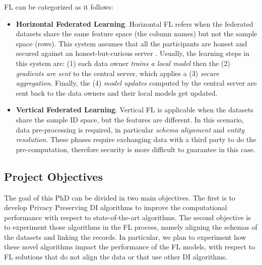 \documentclass[12pt]{article}
\begin{document}
FL can be categorized as it follows: 
\begin{itemize}
   \item \textbf{Horizontal Federated Learning}. Horizontal FL refers when the federated datasets share the same feature space (the column names) but not the sample space (rows). This system
   assumes that all the participants are honest and secured against an honest-but-curious server \cite*{Yang2019}. Usually, the learning steps in this system are: (1) 
   each data owner \textit{trains a local model} then the (2) \textit{gradients are sent} to the central server, which applies a (3) \textit{secure aggregation}. 
   Finally, the (4) \textit{model updates} computed by the central server are sent back to the data owners and their local models get updated.
   \item \textbf{Vertical Federated Learning}. Vertical FL is applicable when the datasets share the sample ID space, but the features are different. In this scenario, data pre-processing is required, in particular 
   \textit{schema alignment} and \textit{entity resolution}. These phases require exchanging data with a third party to do the pre-computation, therefore security is more difficult to guarantee in this case.
\end{itemize}


\subsection{Project Objectives}
The goal of this PhD can be divided in two main objectives. The first is to develop Privacy Preserving DI algorithms to improve the computational 
performance with respect to state-of-the-art algorithms.
The second objective is to experiment those algorithms in the FL process, namely aligning the schemas of the datasets and linking the records. 
In particular, we plan to experiment how these novel algorithms impact the performance of the FL models, with respect to FL solutions that do not align the data or 
that use other DI algorithms. 
\end{document}
